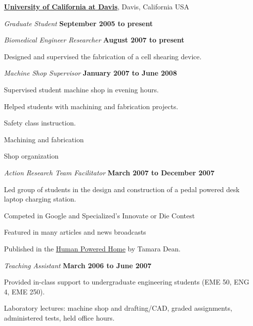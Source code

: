 \documentclass[10pt]{article}
\newenvironment{outerlist}[1][\enskip\textbullet]%
        {\begin{itemize}[#1]}{\end{itemize}%
         \vspace{-.6\baselineskip}}
\newenvironment{innerlist}[1][\enskip\textbullet]%
        {\begin{compactitem}[#1]}{\end{compactitem}}
\begin{document}
\href{http://www.ucdavis.edu}{\textbf{University of California at Davis}}, 
Davis, California USA
\begin{outerlist}
\item[] \textit{Graduate Student}%
        \hfill \textbf{September 2005 to present}

\item[] \textit{Biomedical Engineer Researcher}%
        \hfill \textbf{August 2007 to present}
\begin{innerlist}
\item Designed and supervised the fabrication of a cell shearing device.
\end{innerlist}

\item[] \textit{Machine Shop Supervisor}%
        \hfill \textbf{January 2007 to June 2008}
\begin{innerlist}
\item Supervised student machine shop in evening hours.
\item Helped students with machining and fabrication projects.
\item Safety class instruction.
\item Machining and fabrication
\item Shop organization
\end{innerlist}

\item[] \textit{Action Research Team Facilitator}%
        \hfill \textbf{March 2007 to December 2007}
\begin{innerlist}
\item Led group of students in the design and construction of a pedal powered desk laptop charging station.
\item Competed in Google and Specialized's Innovate or Die Contest
\item Featured in many articles and news broadcasts
\item Published in the \underline{Human Powered Home} by Tamara Dean.
\end{innerlist}

\item[] \textit{Teaching Assistant}%
        \hfill \textbf{March 2006 to June 2007}
\begin{innerlist}
\item Provided in-class support to undergraduate engineering students (EME 50, ENG 4, EME 250).
\item Laboratory lectures: machine shop and drafting/CAD, graded assignments, administered tests, held office hours.
\end{innerlist}


\end{outerlist}
\end{document}
